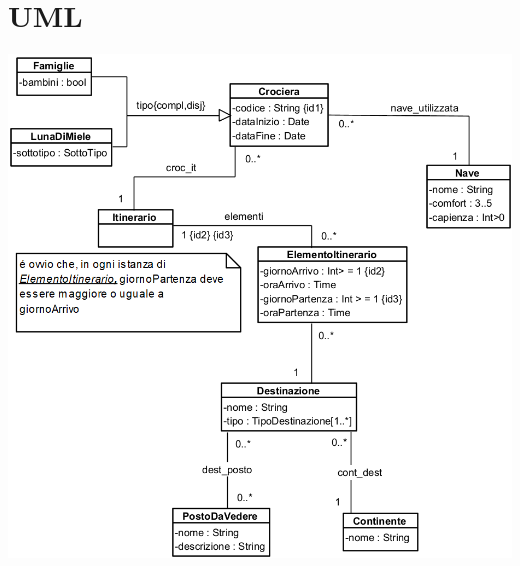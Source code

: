 \documentclass[12pt, letterpaper]{article}
\begin{document}
\section{UML}\begin{center}
    
    \includegraphics[width=\textwidth]{images/UML.png}
\end{center}
\end{document}
